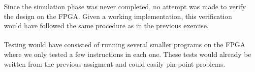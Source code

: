 Since the simulation phase was never completed, no attempt was made to verify
the design on the FPGA. Given a working implementation, this verification would
have followed the same procedure as in the previous exercise.
\paragraph*{}
Testing would have consisted of running several smaller programs on the FPGA
where we only tested a few instructions in each one. These tests would already
be written from the previous assigment and could easily pin-point problems.
